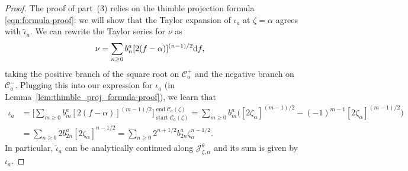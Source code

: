 \documentclass[pdftex]{sigma}
\newcommand{\series}[1]{\tilde{#1}}
\numberwithin{equation}{section}
\begin{document}
\begin{proof}
The proof of part~(3) relies on the thimble projection formula \eqref{eqn:formula-proof}: we will show that the Taylor expansion of $\iota_a$ at $\zeta=\alpha$ agrees with $\series{\iota}_a$. We can rewrite the Taylor series for $\nu$ as
\begin{align*}
\nu & = \sum_{n \ge 0} b_n^a [2(f - \alpha)]^{(n - 1)/2} {\rm d}f,
\end{align*}
taking the positive branch of the square root on $\mathcal{C}^+_a$ and the negative branch on $\mathcal{C}^-_a$. Plugging this into our expression for $\iota_a$ (in Lemma~\ref{lem:thimble_proj_formula-proof}), we learn that
\begin{align*}
\iota_a & = \bigg[ \sum_{m \ge 0} b_m^a [2(f - \alpha)]^{(m - 1)/2} \bigg]_{\operatorname{start} \mathcal{C}_a(\zeta)}^{\operatorname{end} \mathcal{C}_a(\zeta)} = \sum_{m \ge 0} b_m^a \bigl( [2\zeta_\alpha]^{(m - 1)/2} - (-1)^{m-1}[2\zeta_\alpha]^{(m - 1)/2} \bigr) \\
& = \sum_{n \ge 0} 2 b_{2n}^a [2\zeta_\alpha]^{n - 1/2} = \sum_{n \ge 0} 2^{n+1/2} b_{2n}^a \zeta_\alpha^{n - 1/2}.
\end{align*}
In particular, $\series{\iota}_a$ can be analytically continued along $\mathcal{J}_{\zeta,\alpha}^\theta$ and its sum is given by~$\iota_a$.
\end{proof}
\end{document}
